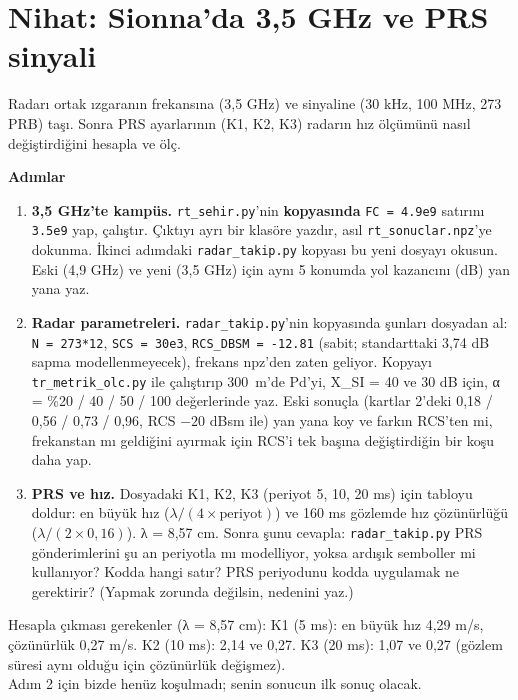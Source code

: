 \documentclass[11pt,a4paper]{article}
\begin{document}
\clearpage
\section*{Nihat: Sionna'da 3,5 GHz ve PRS sinyali}
\begin{amac}
Radarı ortak ızgaranın frekansına (3,5 GHz) ve sinyaline (30 kHz, 100 MHz, 273 PRB) taşı. Sonra PRS ayarlarının (K1, K2, K3) radarın hız ölçümünü nasıl değiştirdiğini hesapla ve ölç.
\end{amac}

\textbf{Adımlar}
\begin{enumerate}[leftmargin=1.6em]
\item \textbf{3,5 GHz'te kampüs.} \texttt{rt\_sehir.py}'nin \textbf{kopyasında} \texttt{FC = 4.9e9} satırını \texttt{3.5e9} yap, çalıştır. Çıktıyı ayrı bir klasöre yazdır, asıl \texttt{rt\_sonuclar.npz}'ye dokunma. İkinci adımdaki \texttt{radar\_takip.py} kopyası bu yeni dosyayı okusun. Eski (4,9 GHz) ve yeni (3,5 GHz) için aynı 5 konumda yol kazancını (dB) yan yana yaz.
\item \textbf{Radar parametreleri.} \texttt{radar\_takip.py}'nin kopyasında şunları dosyadan al: \texttt{N = 273*12}, \texttt{SCS = 30e3}, \texttt{RCS\_DBSM = -12.81} (sabit; standarttaki 3,74 dB sapma modellenmeyecek), frekans npz'den zaten geliyor. Kopyayı \texttt{tr\_metrik\_olc.py} ile çalıştırıp 300~m'de Pd'yi, X\_SI = 40 ve 30 dB için, α = \%20 / 40 / 50 / 100 değerlerinde yaz. Eski sonuçla (kartlar 2'deki 0,18 / 0,56 / 0,73 / 0,96, RCS $-20$ dBsm ile) yan yana koy ve farkın RCS'ten mi, frekanstan mı geldiğini ayırmak için RCS'i tek başına değiştirdiğin bir koşu daha yap.
\item \textbf{PRS ve hız.} Dosyadaki K1, K2, K3 (periyot 5, 10, 20 ms) için tabloyu doldur: en büyük hız ($\lambda / (4 \times \text{periyot})$) ve 160 ms gözlemde hız çözünürlüğü ($\lambda / (2 \times 0{,}16)$). λ = 8,57 cm. Sonra şunu cevapla: \texttt{radar\_takip.py} PRS gönderimlerini şu an periyotla mı modelliyor, yoksa ardışık semboller mi kullanıyor? Kodda hangi satır? PRS periyodunu kodda uygulamak ne gerektirir? (Yapmak zorunda değilsin, nedenini yaz.)
\end{enumerate}

\begin{kontrol}
Hesapla çıkması gerekenler (λ = 8,57 cm): K1 (5 ms): en büyük hız 4,29 m/s, çözünürlük 0,27 m/s. K2 (10 ms): 2,14 ve 0,27. K3 (20 ms): 1,07 ve 0,27 (gözlem süresi aynı olduğu için çözünürlük değişmez).\\
Adım 2 için bizde henüz koşulmadı; senin sonucun ilk sonuç olacak.
\end{kontrol}
\end{document}
